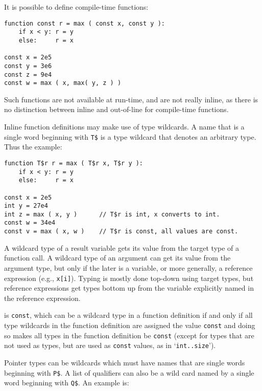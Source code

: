 \documentclass[12pt]{article}
\newenvironment{indpar}[1][0.3in]%
	{\begin{list}{}%
		     {\setlength{\itemsep}{0in}%
		      \setlength{\topsep}{0in}%
		      \setlength{\parsep}{1ex}%
		      \setlength{\labelwidth}{#1}%
		      \setlength{\leftmargin}{#1}%
		      \addtolength{\leftmargin}{\labelsep}}%
	 \item}%
	{\end{list}}
\begin{document}
It is possible to define compile-time functions:

\begin{indpar}\begin{verbatim}
function const r = max ( const x, const y ):
    if x < y: r = y
    else:     r = x

const x = 2e5
const y = 3e6
const z = 9e4
const w = max ( x, max( y, z ) )
\end{verbatim}\end{indpar}

Such functions are not available at run-time, and
are not really inline, as there is no
distinction between inline and out-of-line for compile-time functions.

Inline function definitions may make use of type wildcards.
A name that is a single word beginning with {\tt T\$}
is a type wildcard that denotes
an arbitrary type.  Thus the example:

\begin{indpar}\begin{verbatim}
function T$r r = max ( T$r x, T$r y ):
    if x < y: r = y
    else:     r = x

const x = 2e5
int y = 27e4
int z = max ( x, y )      // T$r is int, x converts to int.
const w = 34e4
const v = max ( x, w )    // T$r is const, all values are const.
\end{verbatim}\end{indpar}

A wildcard type of a result variable gets its value from the
target type of a function call.  A wildcard type of an argument
can get its value from the argument type, but only if the
later is a variable, or more generally, a reference expression
(e.g., {\tt x[i]}).
Typing is mostly done top-down using target types, but reference
expressions get types bottom up from the variable explicitly named
in the reference expression.

is {\tt const}, which can be a wildcard type in a function
definition if and only if all type wildcards in the function definition
are assigned the value {\tt const} and doing so makes
all types in the function definition be {\tt const}
(except for types that are not used as types, but are used as
{\tt const} values, as in `{\tt int..size}').

Pointer types can be wildcards which must have names that are
single words beginning with {\tt P\$}.  A list of qualifiers
can also be a wild card named by a single word beginning with
{\tt Q\$}.  An example is:
\end{document}
